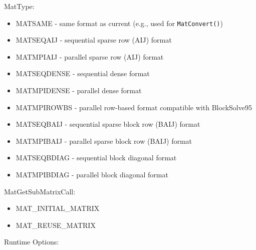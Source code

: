 MatType:
\begin{itemize}
\item MATSAME - same format as current (e.g., used for {\tt MatConvert()})
\item MATSEQAIJ - sequential sparse row (AIJ) format
\item MATMPIAIJ - parallel sparse row (AIJ) format
\item MATSEQDENSE - sequential dense format
\item MATMPIDENSE - parallel dense format
\item MATMPIROWBS - parallel row-based format compatible with BlockSolve95
\item MATSEQBAIJ - sequential sparse block row (BAIJ) format
\item MATMPIBAIJ - parallel sparse block row (BAIJ) format
\item MATSEQBDIAG - sequential block diagonal format
\item MATMPIBDIAG - parallel block diagonal format
\end{itemize}
MatGetSubMatrixCall:
\begin{itemize}
\item MAT\_INITIAL\_MATRIX
\item MAT\_REUSE\_MATRIX
\end{itemize}
Runtime Options:
